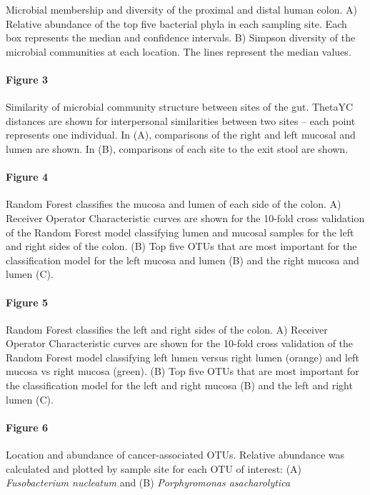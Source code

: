 \documentclass[11pt,]{article}
\let\oldparagraph\paragraph
\renewcommand{\paragraph}[1]{\oldparagraph{#1}\mbox{}}
\begin{document}
Microbial membership and diversity of the proximal and distal human
colon. A) Relative abundance of the top five bacterial phyla in each
sampling site. Each box represents the median and confidence intervals.
B) Simpson diversity of the microbial communities at each location. The
lines represent the median values.

\paragraph{Figure 3}\label{figure-3}

Similarity of microbial community structure between sites of the gut.
ThetaYC distances are shown for interpersonal similarities between two
sites -- each point represents one individual. In (A), comparisons of
the right and left mucosal and lumen are shown. In (B), comparisons of
each site to the exit stool are shown.

\paragraph{Figure 4}\label{figure-4}

Random Forest classifies the mucosa and lumen of each side of the colon.
A) Receiver Operator Characteristic curves are shown for the 10-fold
cross validation of the Random Forest model classifying lumen and
mucosal samples for the left and right sides of the colon. (B) Top five
OTUs that are most important for the classification model for the left
mucosa and lumen (B) and the right mucosa and lumen (C).

\paragraph{Figure 5}\label{figure-5}

Random Forest classifies the left and right sides of the colon. A)
Receiver Operator Characteristic curves are shown for the 10-fold cross
validation of the Random Forest model classifying left lumen versus
right lumen (orange) and left mucosa vs right mucosa (green). (B) Top
five OTUs that are most important for the classification model for the
left and right mucosa (B) and the left and right lumen (C).

\paragraph{Figure 6}\label{figure-6}

Location and abundance of cancer-associated OTUs. Relative abundance was
calculated and plotted by sample site for each OTU of interest: (A)
\emph{Fusobacterium nucleatum} and (B) \emph{Porphyromonas
asacharolytica}
\end{document}
